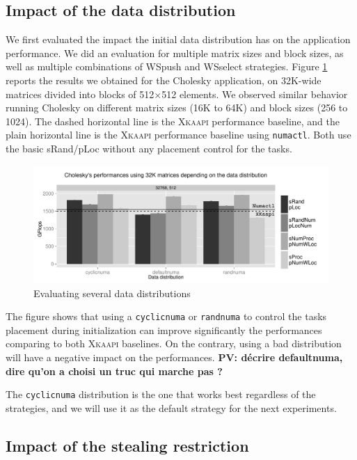 \documentclass{Styles/llncs}
\newcommand{\kaapi}{\textsc{\mbox{Xkaapi}}\xspace}
\newcommand{\PV}[1]{{\color{red}\bfseries PV: #1}}
\begin{document}
\subsection{Impact of the data distribution}

We first evaluated the impact the initial data distribution has on the application performance. We did an evaluation for multiple matrix sizes and block sizes,
as well as multiple combinations of WSpush and WSselect strategies. Figure \ref{fig:eval-distrib} reports the
results we obtained for the Cholesky application, on 32K-wide matrices divided into blocks of 512$\times$512 elements. We observed similar behavior running Cholesky on different matrix sizes (16K to 64K) and block sizes (256 to 1024).
The dashed horizontal line is the \kaapi performance baseline, and the plain
horizontal line is the \kaapi performance baseline using \verb/numactl/. Both use the basic sRand/pLoc without any placement control for the tasks.

\begin{figure}[t]
  \centering
  \includegraphics[scale=0.5]{figures/graph_distrib.pdf}
\caption{Evaluating several data distributions}
\label{fig:eval-distrib}
\end{figure}

The figure shows that using a \verb/cyclicnuma/ or \verb/randnuma/ to control
the tasks placement during initialization can improve significantly the performances
comparing to both \kaapi baselines.
On the contrary, using a bad distribution will have a negative impact on the performances.
\PV{décrire defaultnuma, dire qu'on a choisi un truc qui marche pas ?}

The \verb/cyclicnuma/ distribution is the one that works best regardless of
the strategies, and we will use it as the default strategy for the next experiments.



\subsection{Impact of the stealing restriction}
\end{document}
